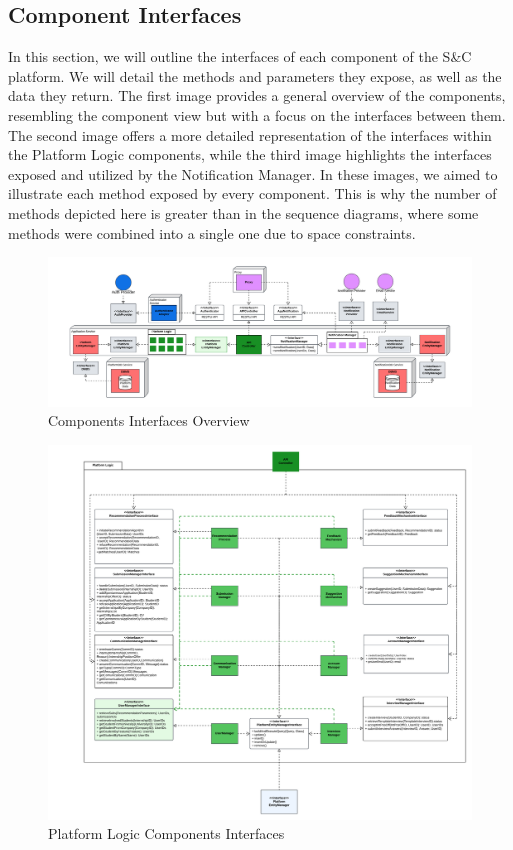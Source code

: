\subsection{Component Interfaces}
In this section, we will outline the interfaces of each component of the S\&C platform. We will detail the methods and parameters they expose, as well as the data they return. The first image provides a general overview of the components, resembling the component view but with a focus on the interfaces between them. The second image offers a more detailed representation of the interfaces within the Platform Logic components, while the third image highlights the interfaces exposed and utilized by the Notification Manager.
In these images, we aimed to illustrate each method exposed by every component. This is why the number of methods depicted here is greater than in the sequence diagrams, where some methods were combined into a single one due to space constraints.
\begin{figure}[H]
    \centering
    \includegraphics[width=\linewidth]{Latex/Images/DD/Interfaces0.png}
    \caption{Components Interfaces Overview}
    \label{fig:intoverview}
\end{figure}
\begin{figure}[H]
    \centering
    \includegraphics[width=\linewidth]{Latex/Images/DD/Interfaces1.png}
    \caption{Platform Logic Components Interfaces}
    \label{fig:pltcompinterfaces}
\end{figure}
